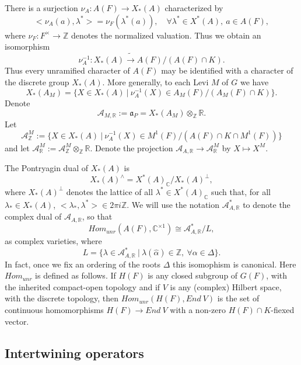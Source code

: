 \documentclass[12pt]{article}
\begin{document}
There is a surjection $\nu_A:A(F)\rightarrow X_*(A)$ characterized by
\begin{equation}\tag{2.4}
<\nu_A(a),\lambda^*>=\nu_F(\lambda^*(a)),\quad\forall\lambda^*\in X^*(A),\ a\in A(F),
\end{equation}
where $\nu_F:F^\times\rightarrow\mathbb{Z}$ denotes the normalized valuation. Thus we obtain an isomorphism
\begin{equation}\tag{2.5}
\nu_A^{-1}:X_*(A)\tilde{\rightarrow}A(F)/(A(F)\cap K).
\end{equation}
Thus every unramified character of $A(F)$ may be identified with a character of the discrete group $X_*(A)$. More generally, to each Levi $M$ of $G$ we have
\[
X_*(A_M)=\{X\in X_*(A)\ |\ \nu_A^{-1}(X)\in A_M(F)/(A_M(F)\cap K)\}.
\]
Denote
\[
\mathcal{A}_{M,\mathbb{R}}:=\mathfrak{a}_P=X_*(A_M)\otimes_{\mathbb{Z}}\mathbb{R}.
\]
Let
\[
\mathcal{A}^M_{\mathbb{Z}}:=\{X\in X_*(A)\ |\ \nu_A^{-1}(X)\in M^1(F)/(A(F)\cap K\cap M^1(F))\}
\]
and let $\mathcal{A}^M_{\mathbb{R}}:=\mathcal{A}^M_{\mathbb{Z}}\otimes_{\mathbb{Z}}\mathbb{R}$. Denote the projection $\mathcal{A}_{A,\mathbb{R}}\rightarrow\mathcal{A}^M_{\mathbb{R}}$ by $X\longmapsto X^M$.

The Pontryagin dual of $X_*(A)$ is
\begin{equation}\tag{2.6}
X_*(A)^\wedge=X^*(A)_{\mathbb{C}}/X_*(A)^\perp,
\end{equation}
where $X_*(A)^\perp$ denotes the lattice of all $\lambda^*\in X^*(A)_{\mathbb{C}}$ such that, for all $\lambda_*\in X_*(A)$, $<\lambda_*,\lambda^*>\in2\pi i\mathbb{Z}$. We will use the notation $\mathcal{A}^*_{A,\mathbb{R}}$ to denote the complex dual of $\mathcal{A}_{A,\mathbb{R}}$, so that
\begin{equation}\tag{2.7}
Hom_{unr}(A(F),\mathbb{C}^{\times1})\cong\mathcal{A}^*_{A,\mathbb{R}}/L,
\end{equation}
as complex varieties, where
\[
L=\{\lambda\in\mathcal{A}^*_{A,\mathbb{R}}\ |\ \lambda(\hat\alpha)\in\mathbb{Z},\ \forall\alpha\in\Delta\}.
\]
In fact, once we fix an ordering of the roots $\Delta$ this isomophism is canonical. Here $Hom_{unr}$ is defined as follows. If $H(F)$ is any closed subgroup of $G(F)$, with the inherited compact-open topology and if $V$ is any (complex) Hilbert space, with the discrete topology, then $Hom_{unr}(H(F),End\ V)$ is the set of continuous homomorphisms $H(F)\rightarrow End\ V$ with a non-zero $H(F)\cap K$-fiexed vector.

\subsection{Intertwining operators}
\end{document}
